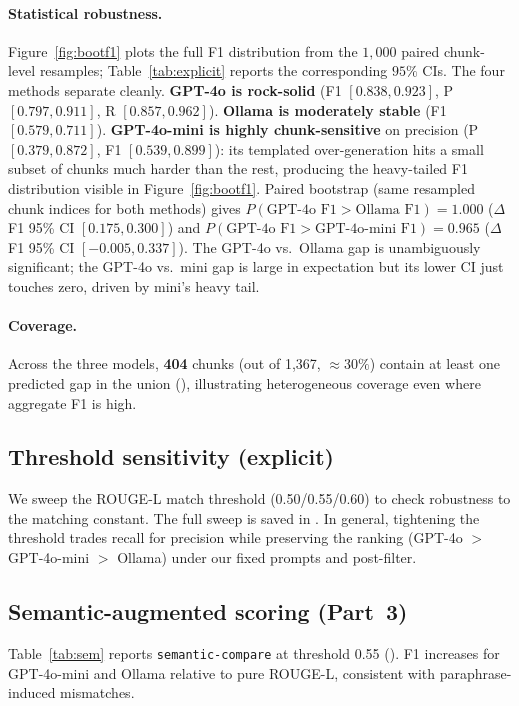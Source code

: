 \documentclass{article}
\begin{document}
\paragraph{Statistical robustness.} Figure~\ref{fig:bootf1} plots the full F1 distribution from the $1{,}000$ paired chunk-level resamples; Table~\ref{tab:explicit} reports the corresponding $95\%$ CIs. The four methods separate cleanly. \textbf{GPT-4o is rock-solid} (F1 $[0.838, 0.923]$, P $[0.797, 0.911]$, R $[0.857, 0.962]$). \textbf{Ollama is moderately stable} (F1 $[0.579, 0.711]$). \textbf{GPT-4o-mini is highly chunk-sensitive} on precision (P $[0.379, 0.872]$, F1 $[0.539, 0.899]$): its templated over-generation hits a small subset of chunks much harder than the rest, producing the heavy-tailed F1 distribution visible in Figure~\ref{fig:bootf1}. Paired bootstrap (same resampled chunk indices for both methods) gives $P(\text{GPT-4o F1} > \text{Ollama F1}) = 1.000$ ($\Delta$F1 95\% CI $[0.175, 0.300]$) and $P(\text{GPT-4o F1} > \text{GPT-4o-mini F1}) = 0.965$ ($\Delta$F1 95\% CI $[-0.005, 0.337]$). The GPT-4o vs.\ Ollama gap is unambiguously significant; the GPT-4o vs.\ mini gap is large in expectation but its lower CI just touches zero, driven by mini's heavy tail.

\paragraph{Coverage.} Across the three models, \textbf{404} chunks (out of 1{,}367, $\approx 30\%$) contain at least one predicted gap in the union (), illustrating heterogeneous coverage even where aggregate F1 is high.

\subsection{Threshold sensitivity (explicit)}
We sweep the ROUGE-L match threshold (0.50/0.55/0.60) to check robustness to the matching constant. The full sweep is saved in . In general, tightening the threshold trades recall for precision while preserving the ranking (GPT-4o $>$ GPT-4o-mini $>$ Ollama) under our fixed prompts and post-filter.

\subsection{Semantic-augmented scoring (Part~3)}
Table~\ref{tab:sem} reports \texttt{semantic-compare} at threshold 0.55 (). F1 increases for GPT-4o-mini and Ollama relative to pure ROUGE-L, consistent with paraphrase-induced mismatches.
\end{document}

